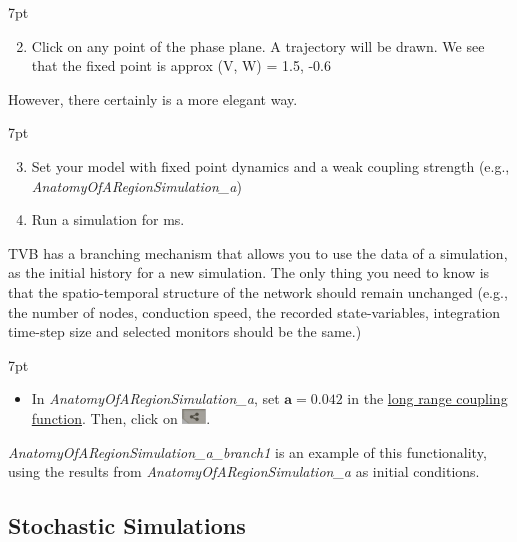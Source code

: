 \documentclass{tufte-handout}
\newenvironment{simulation}{%
  \def\FrameCommand{%
    \hspace{1pt}%
    {\color{ForestGreen}\vrule width 2pt}%
    {\color{simulationshade}\vrule width 4pt}%
    \colorbox{simulationshade}%
  }%
  \MakeFramed{\advance\hsize-\width\FrameRestore}%
  \noindent\hspace{-4.55pt}%
  \begin{adjustwidth}{}{7pt}%
  \vspace{2pt}\vspace{2pt}%
}
{%
  \vspace{2pt}\end{adjustwidth}\endMakeFramed%
}
\begin{document}
\begin{simulation}
\begin{enumerate}[resume]
  \setcounter{enumi}{1}
\item  Click on any point of the phase plane. A trajectory will be drawn.
We see that the fixed point is approx (V, W) = 1.5, -0.6
\end{enumerate}
\end{simulation}


However, there certainly is a more elegant way. 

\begin{simulation}
\begin{enumerate}[resume]
 \setcounter{enumi}{2}
\item Set your model with fixed point dynamics and a weak coupling strength (e.g., \textit{AnatomyOfARegionSimulation\_a})
\item Run a simulation for \unit[1000]{ms}.
\end{enumerate}
\end{simulation}

TVB has a branching mechanism that allows you to use the data of a simulation, as the initial history for a new simulation. The only thing you
need to know is that the spatio-temporal structure of the network should
remain unchanged (e.g., the number of nodes, conduction speed, the recorded state-variables, integration time-step size and selected monitors should be the same.)

\begin{simulation}
\begin{itemize}[resume]
 \setcounter{enumi}{4}
 \item In \textit{AnatomyOfARegionSimulation\_a}, set $\mathbf{a=0.042}$ in the \underline{long range coupling function}. Then, click on \includegraphics[width=0.05\textwidth]{butt_branching.png}. 
\end{itemize}
\end{simulation}

\textit{AnatomyOfARegionSimulation\_a\_branch1} is an example of this functionality, using the results from \textit{AnatomyOfARegionSimulation\_a} as initial conditions. 

\subsection{Stochastic Simulations}\label{sec:results}
\end{document}
